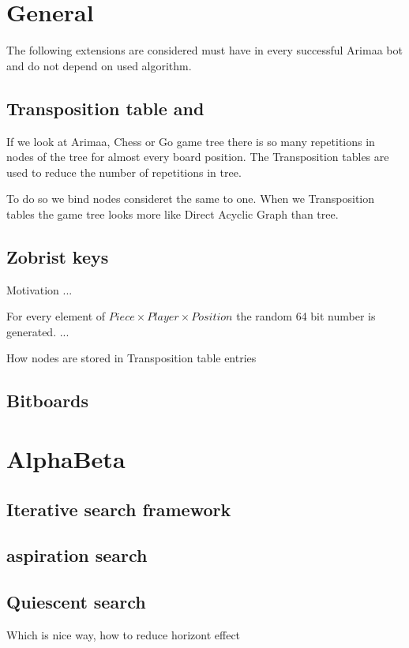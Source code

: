 \documentclass[12pt,titlepage,fleqn]{report}
\begin{document}
\section{General}
The following extensions are considered must have in every successful Arimaa
bot and do not depend on used algorithm.

\subsection{Transposition table and}
If we look at Arimaa, Chess or Go game tree there is so many repetitions in
nodes of the tree for almost every board position. The Transposition tables
are used to reduce the number of repetitions in tree.

To do so we bind nodes consideret the same to one. When we Transposition
tables the game tree looks more like Direct Acyclic Graph than tree.

\subsection{Zobrist keys}
Motivation ...

For every element of $Piece\times Player\times Position$ the random 64 bit
number is generated. ...

How nodes are stored in Transposition table entries

\subsection{Bitboards}

\section{AlphaBeta}
\subsection{Iterative search framework}
\subsection{aspiration search}
\subsection{Quiescent search}
  Which is nice way, how to reduce horizont effect
\end{document}
